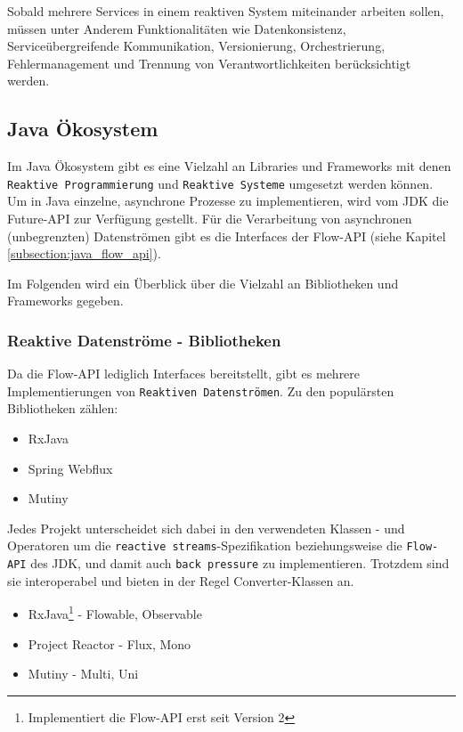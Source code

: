 Sobald mehrere Services in einem reaktiven System miteinander arbeiten sollen, müssen unter Anderem Funktionalitäten wie
Datenkonsistenz, Serviceübergreifende Kommunikation, Versionierung, Orchestrierung, Fehlermanagement und Trennung von Verantwortlichkeiten
berücksichtigt werden.

\subsection{Java Ökosystem}
\label{subsec:java_ökosystem}
Im Java Ökosystem gibt es eine Vielzahl an Libraries und Frameworks mit denen
\verb|Reaktive Programmierung| und \verb|Reaktive Systeme| umgesetzt werden können.
Um in Java einzelne, asynchrone Prozesse zu implementieren, wird vom JDK die Future-API zur Verfügung gestellt.\parencite{OracleFuture}
Für die Verarbeitung von asynchronen (unbegrenzten) Datenströmen gibt es die Interfaces der Flow-API (siehe Kapitel \ref{subsection:java_flow_api}).
\parencite{OracleFlow}

Im Folgenden wird ein Überblick über die Vielzahl an Bibliotheken und Frameworks gegeben.

\subsubsection{Reaktive Datenströme - Bibliotheken}
\label{subsubsec:reactive_streams}
Da die Flow-API lediglich Interfaces bereitstellt, gibt es mehrere Implementierungen von \verb|Reaktiven Datenströmen|.
Zu den populärsten Bibliotheken zählen:
\begin{itemize}
    \item RxJava
    \item Spring Webflux
    \item Mutiny
\end{itemize}
Jedes Projekt unterscheidet sich dabei in den verwendeten Klassen - und Operatoren um die \verb|reactive streams|-Spezifikation
beziehungsweise die \verb|Flow-API| des JDK, und damit auch \verb|back pressure| zu implementieren.
Trotzdem sind sie interoperabel und bieten in der Regel Converter-Klassen an.
\begin{itemize}
    \item RxJava\footnote{Implementiert die Flow-API erst seit Version 2} - Flowable, Observable \parencite{RxJava}
    \item Project Reactor - Flux, Mono \parencite{ProjectReactor}
    \item Mutiny - Multi, Uni \parencite{Mutiny}
\end{itemize}

